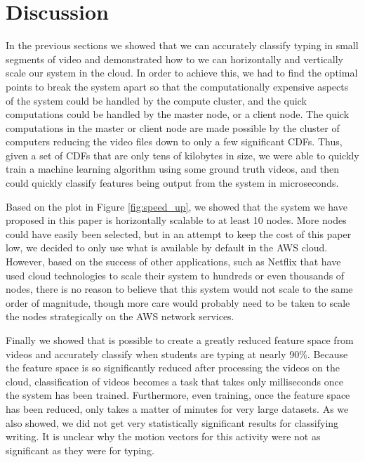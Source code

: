 %


\section{Discussion}
In the previous sections we showed that we can accurately classify typing in
small segments of video and demonstrated how to we can horizontally and vertically
scale our system in the cloud. In order to achieve this, we had to find the
optimal points to break the system apart so that the computationally
expensive aspects of the system could be handled by the compute cluster, and the
quick computations could be handled by the master node, or a client node.
The quick computations in the master or client node are made possible by the
cluster of computers reducing the video files down to only a few significant
CDFs. Thus, given a set of CDFs that are only tens of kilobytes in size, we
were able to quickly train a machine learning algorithm using some ground truth
videos, and then could quickly classify features being output from the system
in microseconds.

Based on the plot in Figure \ref{fig:speed_up}, we showed that the system
we have proposed in this paper is horizontally scalable to at least 10 nodes.
More nodes could have easily been selected, but in an attempt to keep the cost
of this paper low, we decided to only use what is available by default in the
AWS cloud. However, based on the success of other applications, such as
Netflix that have used cloud technologies to scale their system to hundreds
or even thousands of nodes, there is no reason to believe that this system
would not scale to the same order of magnitude, though more care would probably
need to be taken to scale the nodes strategically on the AWS network services.

Finally we showed that is possible to create a greatly reduced feature space
from videos and accurately classify when students are typing at nearly 90\%.
Because the feature space is so significantly reduced after processing the
videos on the cloud, classification of videos becomes a task that takes only
milliseconds once the system has been trained. Furthermore, even training, once
the feature space has been reduced, only takes a matter of minutes for very
large datasets. As we also showed, we did not get very statistically significant
results for classifying writing. It is unclear why the motion vectors for this
activity were not as significant as they were for typing.

